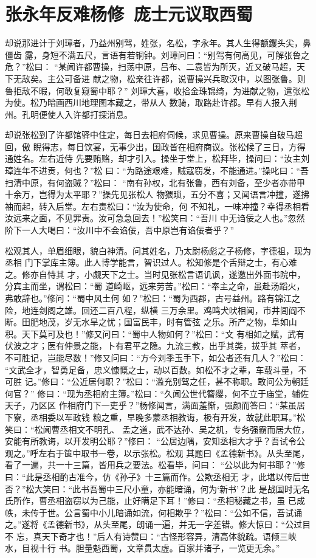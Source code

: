 \chapter{张永年反难杨修~庞士元议取西蜀}

却说那进计于刘璋者，乃益州别驾，姓张，名松，字永年。其人生得额钁头尖，鼻僵齿
露，身短不满五尺，言语有若铜钟。刘璋问曰：“别驾有何高见，可解张鲁之危？”松曰：
“某闻许都曹操，扫荡中原，吕布、二袁皆为所灭，近又破马超，天下无敌矣。主公可备进
献之物，松亲往许都，说曹操兴兵取汉中，以图张鲁。则鲁拒敌不暇，何敢复窥蜀中耶？”
刘璋大喜，收拾金珠锦绮，为进献之物，遣张松为使。松乃暗画西川地理图本藏之，带从人
数骑，取路赴许都。早有人报入荆州。孔明便使人入许都打探消息。

却说张松到了许都馆驿中住定，每日去相府伺候，求见曹操。原来曹操自破马超回，傲
睨得志，每日饮宴，无事少出，国政皆在相府商议。张松候了三日，方得通姓名。左右近侍
先要贿赂，却才引入。操坐于堂上，松拜毕，操问曰：“汝主刘璋连年不进贡，何也？”松
曰：“为路途艰难，贼寇窃发，不能通进。”操叱曰：“吾扫清中原，有何盗贼？”松曰：
“南有孙权，北有张鲁，西有刘备，至少者亦带甲十余万，岂得为太平耶？”操先见张松人
物猥琐，五分不喜；又闻语言冲撞，遂拂袖而起，转入后堂。左右责松曰：“汝为使命，何
不知礼，一味冲撞？幸得丞相看汝远来之面，不见罪责。汝可急急回去！”松笑曰：“吾川
中无诌佞之人也。”忽然阶下一人大喝曰：“汝川中不会谄佞，吾中原岂有谄佞者乎？”

松观其人，单眉细眼，貌白神清。问其姓名，乃太尉杨彪之子杨修，字德祖，现为丞相
门下掌库主簿。此人博学能言，智识过人。松知修是个舌辩之士，有心难之。修亦自恃其
才，小觑天下之士。当时见张松言语讥讽，遂邀出外面书院中，分宾主而坐，谓松曰：“蜀
道崎岖，远来劳苦。”松曰：“奉主之命，虽赴汤蹈火，弗敢辞也。”修问：“蜀中风土何
如？”松曰：“蜀为西郡，古号益州。路有锦江之险，地连剑阁之雄。回还二百八程，纵横
三万余里。鸡鸣犬吠相闻，市井闾阎不断。田肥地茂，岁无水旱之忧；国富民丰，时有管弦
之乐。所产之物，阜如山积。天下莫可及也！”修又问曰：“蜀中人物如何？”松曰：“文
有相如之赋，武有伏波之才；医有仲景之能，卜有君平之隐。九流三教，出乎其类，拔乎其
萃者，不可胜记，岂能尽数！”修又问曰：“方今刘季玉手下，如公者还有几人？”松曰：
“文武全才，智勇足备，忠义慷慨之士，动以百数。如松不才之辈，车载斗量，不可胜
记。”修曰：“公近居何职？”松曰：“滥充别驾之任，甚不称职。敢问公为朝廷何官？”
修曰：“现为丞相府主簿。”松曰：“久闻公世代簪缨，何不立于庙堂，辅佐天子，乃区区
作相府门下一吏乎？”杨修闻言，满面羞惭，强颜而答曰：“某虽居下寮，丞相委以军政钱
粮之重，早晚多蒙丞相教诲，极有开发，故就此职耳。”松笑曰：“松闻曹丞相文不明孔、
孟之道，武不达孙、吴之机，专务强霸而居大位，安能有所教诲，以开发明公耶？”修曰：
“公居边隅，安知丞相大才乎？吾试令公观之。”呼左右于箧中取书一卷，以示张松。松观
其题曰《孟德新书》。从头至尾，看了一遍，共一十三篇，皆用兵之要法。松看毕，问曰：
“公以此为何书耶？”修曰：“此是丞相酌古准今，仿《孙子》十三篇而作。公欺丞相无
才，此堪以传后世否？”松大笑曰：“此书吾蜀中三尺小童，亦能暗诵，何为‘新书’？此
是战国时无名氏所作，曹丞相盗窃以为己能，止好瞒足下耳！”修曰：“丞相秘藏之书，虽
已成帙，未传于世。公言蜀中小儿暗诵如流，何相欺乎？”松曰：“公如不信，吾试诵
之。”遂将《孟德新书》，从头至尾，朗诵一遍，并无一字差错。修大惊曰：“公过目不
忘，真天下奇才也！”后人有诗赞曰：“古怪形容异，清高体貌疏。语倾三峡水，目视十行
书。胆量魁西蜀，文章贯太虚。百家并诸子，一览更无余。”

